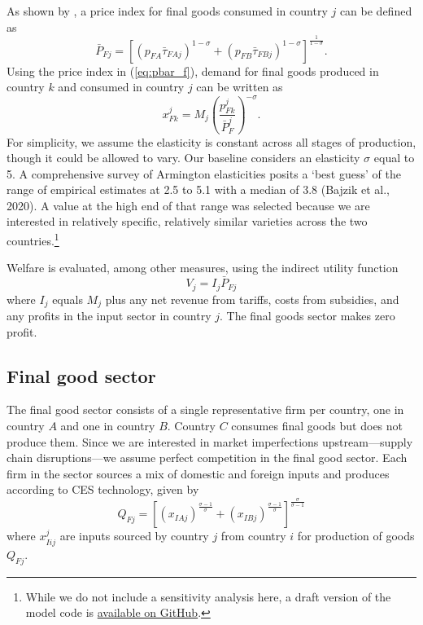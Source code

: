 \documentclass{article}
\begin{document}
As shown by \textcite{dixit_monopolistic_1977}, a price index for final goods consumed in country $j$ can be defined as
\begin{equation} \label{eq:pbar_f}
      \bar{P}_{Fj} = \left[ (p_{FA} \bar{\tau}_{FAj} )^{1-\sigma} +  (p_{FB} \bar{\tau}_{FBj})^{1-\sigma} \right]^\frac{1}{1-\sigma} .
\end{equation}
Using the price index in (\ref{eq:pbar_f}), demand for final goods produced in country $k$ and consumed in country $j$ can be written as
\begin{equation}
    x_{Fk}^{j} = M_j \left( \frac{p_{Fk}^{j}}{\bar{P}_F^{j}} \right)^{-\sigma}  .
\end{equation}
For simplicity, we assume the elasticity is constant across all stages of production, though it could be allowed to vary. Our baseline considers an elasticity $\sigma$ equal to 5. A comprehensive survey of Armington elasticities posits a `best guess' of the range of empirical estimates at 2.5 to 5.1 with a median of 3.8 (Bajzik et al., 2020). A value at the high end of that range was selected because we are interested in relatively specific, relatively similar varieties across the two countries.\footnote{While we do not include a sensitivity analysis here, a draft version of the model code is \href{https://github.com/sjhardwick/supply_chains}{available on GitHub}.}

Welfare is evaluated, among other measures, using the indirect utility function
\begin{equation} \label{eq:value}
    V_j = I_j \bar{P}_{Fj}
\end{equation}
where $I_j$ equals $M_j$ plus any net revenue from tariffs, costs from subsidies, and any profits in the input sector in country $j$. The final goods sector makes zero profit.

\subsection{Final good sector}

The final good sector consists of a single representative firm per country, one in country $A$ and one in country $B$. Country $C$ consumes final goods but does not produce them. Since we are interested in market imperfections upstream---supply chain disruptions---we assume perfect competition in the final good sector. Each firm in the sector sources a mix of domestic and foreign inputs and produces according to CES technology, given by
\begin{equation} \label{eq:prod_final}
    Q_{Fj} = \left[ \left( x_{IAj} \right)^\frac{\sigma-1}{\sigma} + \left( x_{IBj} \right)^\frac{\sigma-1}{\sigma} \right]^\frac{\sigma}{\sigma-1}
\end{equation}
where $x^j_{Iij}$ are inputs sourced by country $j$ from country $i$ for production of goods $Q_{Fj}$. 
\end{document}
